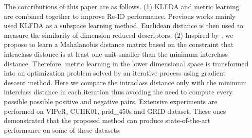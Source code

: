 \documentclass[10pt,twocolumn,letterpaper]{article}
\begin{document}
\indent The contributions of this paper are as follows. (1) KLFDA and metric learning are combined together to improve Re-ID performance. Previous works mainly used KLFDA  \cite{KernelVersionMetrics} as a subspace learning method. Euclidean distance is then used to measure the similarity of dimension reduced descriptors. (2) Inspired by \cite{TDL}, we propose to learn a Mahalanobis distance matrix based on the constraint that intraclass distance is at least one unit smaller than the minimum interclass distance. Therefore, metric learning in the lower dimensional space is transformed into an optimization problem solved by an iterative process using gradient descent method. Here we compare the intraclass distance only with the minimum interclass distance in each iteration thus avoiding the need to compute every possible possible positive and negative pairs. Extensive experiments are performed on VIPeR, CUHK01, prid\_450s and GRID dataset. These ones demonstrated that the proposed method can produce state-of-the-art performance on some of these datasets.

\end{document}
